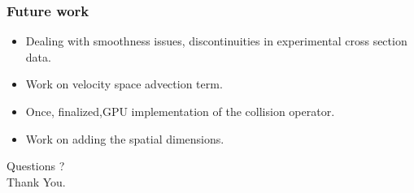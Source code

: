 \documentclass[mathserif, aspectratio=169]{beamer}
\begin{document}
	\begin{frame}
		\frametitle{Future work}
		\begin{itemize}
			\item Dealing with smoothness issues, discontinuities in experimental cross section data. 
			\item Work on velocity space advection term. 
			\item Once, finalized,GPU implementation of the collision operator. 
			\item Work on adding the spatial dimensions. 
		\end{itemize}
		\pause
		\begin{center}
			\Large Questions ? \\
			\Large Thank You. 
		\end{center}
	\end{frame}
\end{document}
